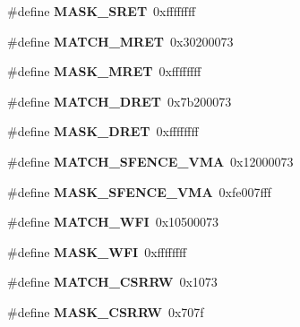 \begin{DoxyCompactItemize}
\#define {\bfseries M\+A\+S\+K\+\_\+\+S\+R\+ET}~0xffffffff
\item 
\mbox{\label{riscv-utility_8h_afc2164c7a69bd90e414506641376b387}} 
\#define {\bfseries M\+A\+T\+C\+H\+\_\+\+M\+R\+ET}~0x30200073
\item 
\mbox{\label{riscv-utility_8h_a40497cb1a268143849506ad2c8765223}} 
\#define {\bfseries M\+A\+S\+K\+\_\+\+M\+R\+ET}~0xffffffff
\item 
\mbox{\label{riscv-utility_8h_aa539e42d4140a40b58bf2894761d0464}} 
\#define {\bfseries M\+A\+T\+C\+H\+\_\+\+D\+R\+ET}~0x7b200073
\item 
\mbox{\label{riscv-utility_8h_abafe7a5bdbcde089136cded41689e5d5}} 
\#define {\bfseries M\+A\+S\+K\+\_\+\+D\+R\+ET}~0xffffffff
\item 
\mbox{\label{riscv-utility_8h_a327204ed21f0718e3f8bf7901533d099}} 
\#define {\bfseries M\+A\+T\+C\+H\+\_\+\+S\+F\+E\+N\+C\+E\+\_\+\+V\+MA}~0x12000073
\item 
\mbox{\label{riscv-utility_8h_abe6b193ba537ef0c210f3dd88e86b141}} 
\#define {\bfseries M\+A\+S\+K\+\_\+\+S\+F\+E\+N\+C\+E\+\_\+\+V\+MA}~0xfe007fff
\item 
\mbox{\label{riscv-utility_8h_a1b1feae8fe577f4e563f8723d3c59edc}} 
\#define {\bfseries M\+A\+T\+C\+H\+\_\+\+W\+FI}~0x10500073
\item 
\mbox{\label{riscv-utility_8h_a8db7172b12ebd0beea324a66cfacdc99}} 
\#define {\bfseries M\+A\+S\+K\+\_\+\+W\+FI}~0xffffffff
\item 
\mbox{\label{riscv-utility_8h_a0db4e28f8ee91d9b813c6d12ca55fdc6}} 
\#define {\bfseries M\+A\+T\+C\+H\+\_\+\+C\+S\+R\+RW}~0x1073
\item 
\mbox{\label{riscv-utility_8h_a902d5086d22c4392f5b0eca6cf8dfe03}} 
\#define {\bfseries M\+A\+S\+K\+\_\+\+C\+S\+R\+RW}~0x707f
\item 
\mbox{\label{riscv-utility_8h_a5fb4428097d53dab3034bcf1168f5eb1}} 

\end{DoxyCompactItemize}
